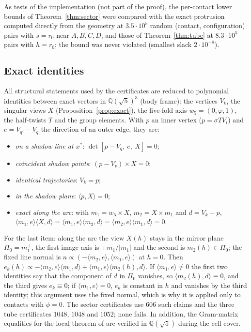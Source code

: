 \documentclass[11pt]{amsart}
\theoremstyle{definition}
\newcommand{\Q}{\mathbb{Q}}
\newcommand{\sq}{\sqrt5}
\newcommand{\gr}{\varphi}          %
\newcommand{\ip}[2]{\langle #1,#2\rangle}
\newcommand{\abs}[1]{\lvert #1\rvert}
\begin{document}
As tests of the implementation (not part of the proof), the per-contact lower bounds of Theorem~\ref{thm:sector} were
compared with the exact protrusion computed directly from the geometry at $3.5\cdot10^5$ random (contact,
configuration) pairs with $s=r_0$ near $A,B,C,D$, and those of Theorem~\ref{thm:tube} at $8.3\cdot10^5$ pairs with
$h=r_0$; the bound was never violated (smallest slack $2\cdot10^{-8}$).

\subsection{Exact identities}\label{sec:exactid}
All structural statements used by the certificates are reduced to polynomial identities between exact vectors in
$\Q(\sq)^3$ (body frame): the vertices $V_k$, the singular views $X$ (Proposition~\ref{prop:exact}), the five-fold axis
$w_5=(0,\gr,1)$, the half-twists $T$ and the group elements. With $p$ an inner vertex ($p=\sigma TV_i$) and $e=V_{q'}-V_q$
the direction of an outer edge, they are:
\begin{itemize}
\item \emph{on a shadow line at $x^*$}: $\det[p-V_q,\ e,\ X]=0$;
\item \emph{coincident shadow points}: $(p-V_v)\times X=0$;
\item \emph{identical trajectories}: $V_k=p$;
\item \emph{in the shadow plane}: $\ip pX=0$;
\item \emph{exact along the arc}: with $m_1=w_5\times X$, $m_2=X\times m_1$ and $d=V_k-p$,
 $\ip{m_1}{e}\ip Xd=\ip{m_1}{e}\ip{m_2}d=\ip{m_2}{e}\ip{m_1}d=0$.
\end{itemize}
For the last item: along the arc the view $X(h)$ stays in the mirror plane $\Pi_0=m_1^\perp$, the first image axis is
$\pm m_1/\abs{m_1}$ and the second is $m_2(h)\in\Pi_0$; the fixed line normal is $n\propto(-\ip{m_2}{e},\ip{m_1}{e})$
at $h=0$. Then $e_k(h)\propto-\ip{m_2}e\ip{m_1}d+\ip{m_1}e\ip{m_2(h)}d$. If $\ip{m_1}e\ne0$ the first two identities
say that the component of $d$ in $\Pi_0$ vanishes, so $\ip{m_2(h)}d\equiv0$, and the third gives $e_k\equiv0$; if
$\ip{m_1}e=0$, $e_k$ is constant in $h$ and vanishes by the third identity; this argument uses the fixed normal, which
is why it is applied only to contacts with $\phi=0$. The sector certificates use $606$ such claims and the three tube
certificates $1048$, $1048$ and $1052$; none fails. In addition, the Gram-matrix equalities for the local theorem of
\cite{SY25} are verified in $\Q(\sq)$ during the cell cover.
\end{document}
